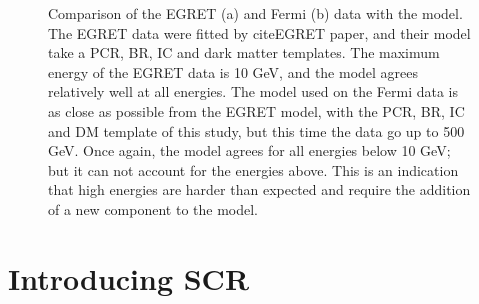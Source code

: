 \begin{figure}[h]
  \caption{Comparison of the EGRET (a) and Fermi (b) data with the model. The EGRET data were fitted by cite{EGRET paper}, and their model take a PCR, BR, IC and dark matter templates. The maximum energy of the EGRET data is 10 GeV, and the model agrees relatively well at all energies. The model used on the Fermi data is as close as possible from the EGRET model, with the PCR, BR, IC and DM template of this study, but this time the data go up to 500 GeV. Once again, the model agrees for all energies below 10 GeV; but it can not account for the energies above. This is an indication that high energies are harder than expected and require the addition of a new component to the model.}
  \label{fig:EGRET_comp}
\end{figure}


\newpage
\section{Introducing SCR}

